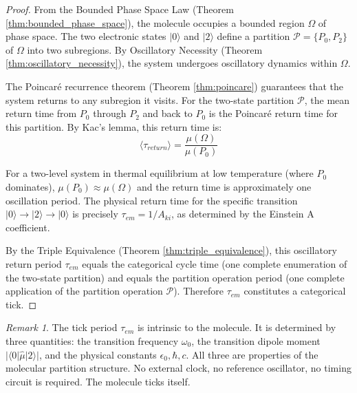 \documentclass[11pt,a4paper]{article}
\theoremstyle{definition}
\theoremstyle{remark}
\newtheorem{remark}[theorem]{Remark}
\begin{document}
\begin{proof}
From the Bounded Phase Space Law (Theorem \ref{thm:bounded_phase_space}), the molecule occupies a bounded region $\Omega$ of phase space. The two electronic states $|0\rangle$ and $|2\rangle$ define a partition $\mathcal{P} = \{P_0, P_2\}$ of $\Omega$ into two subregions. By Oscillatory Necessity (Theorem \ref{thm:oscillatory_necessity}), the system undergoes oscillatory dynamics within $\Omega$.

The Poincaré recurrence theorem (Theorem \ref{thm:poincare}) guarantees that the system returns to any subregion it visits. For the two-state partition $\mathcal{P}$, the mean return time from $P_0$ through $P_2$ and back to $P_0$ is the Poincaré return time for this partition. By Kac's lemma, this return time is:
\begin{equation}
\langle \tau_{return} \rangle = \frac{\mu(\Omega)}{\mu(P_0)}
\end{equation}

For a two-level system in thermal equilibrium at low temperature (where $P_0$ dominates), $\mu(P_0) \approx \mu(\Omega)$ and the return time is approximately one oscillation period. The physical return time for the specific transition $|0\rangle \to |2\rangle \to |0\rangle$ is precisely $\tau_{em} = 1/A_{ki}$, as determined by the Einstein A coefficient.

By the Triple Equivalence (Theorem \ref{thm:triple_equivalence}), this oscillatory return period $\tau_{em}$ equals the categorical cycle time (one complete enumeration of the two-state partition) and equals the partition operation period (one complete application of the partition operation $\mathcal{P}$). Therefore $\tau_{em}$ constitutes a categorical tick.
\end{proof}

\begin{remark}
The tick period $\tau_{em}$ is intrinsic to the molecule. It is determined by three quantities: the transition frequency $\omega_0$, the transition dipole moment $|\langle 0|\hat{\mu}|2\rangle|$, and the physical constants $\epsilon_0, \hbar, c$. All three are properties of the molecular partition structure. No external clock, no reference oscillator, no timing circuit is required. The molecule ticks itself.
\end{remark}
\end{document}

